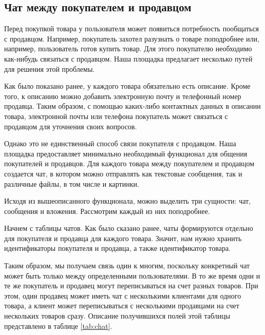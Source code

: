 \documentclass[a4paper,14pt]{extarticle}
\begin{document}
\subsection{Чат между покупателем и продавцом}

Перед покупкой товара у пользователя может появиться потребность пообщаться с продавцом. Например, покупатель захотел разузнать о товаре поподробнее или, например, пользователь готов купить товар. Для этого покупателю необходимо как-нибудь связаться с продавцом. Наша площадка предлагает несколько путей для решения этой проблемы.

Как было показано ранее, у каждого товара обязательно есть описание. Кроме того, к описанию можно добавить электронную почту и телефонный номер продавца. Таким образом, с помощью каких-либо контактных данных в описании товара, электронной почты или телефона покупатель может связаться с продавцом для уточнения своих вопросов.

Однако это не единственный способ связи покупателя с продавцом. Наша площадка предоставляет минимально необходимый функционал для общения покупателей и продавцов. Для каждого товара между покупателем и продавцом создается чат, в котором можно отправлять как текстовые сообщения, так и различные файлы, в том числе и картинки.

Исходя из вышеописанного функционала, можно выделить три сущности: чат, сообщения и вложения. Рассмотрим каждый из них поподробнее.

Начнем с таблицы чатов. Как было сказано ранее, чаты формируются отдельно для покупателя и продавца для каждого товара. Значит, нам нужно хранить идентификаторы покупателя и продавца, а также идентификатор товара.

Таким образом, мы получаем связь один к многим, поскольку конкретный чат может быть только между определенными пользователями. В то же время одни и те же покупатель и продавец могут переписываться на счет разных товаров. При этом, один продавец может иметь чат с несколькими клиентами для одного товара, а клиент может переписываться с несколькими продавцами на счет нескольких товаров сразу. Описание получившихся полей этой таблицы представлено в таблице \ref{tab:chat}.
\end{document}
